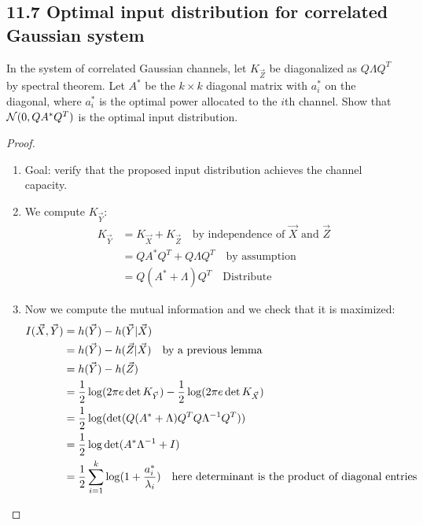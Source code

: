 \documentclass[../main.tex]{subfiles}
\begin{document}
\subsection*{11.7 Optimal input distribution for correlated Gaussian system}
In the system of correlated Gaussian channels, let $K_{\vec Z}$ be diagonalized as $Q\Lambda Q^T$ by spectral theorem. Let $A^*$ be the $k\times k$ diagonal matrix with $a_i^*$ on the diagonal, where $a_i^*$ is the optimal power allocated to the $i$th channel. Show that $\mathcal{N}(0,QA^*Q^T)$ is the optimal input distribution.
\begin{proof}
    \begin{enumerate}
        \item Goal: verify that the proposed input distribution achieves the channel capacity.
        \item We compute $K_{\vec Y}$: \begin{align*}
            K_{\vec Y} &= K_{\vec X}+K_{\vec Z} \quad \text{by independence of $\vec X$ and $\vec Z$}\\
            &= Q A^* Q^T + Q\Lambda Q^T \quad\text{by assumption}\\
            &= Q(A^*+\Lambda)Q^T \quad\text{Distribute}
        \end{align*}
        \item Now we compute the mutual information and we check that it is maximized: \begin{align*}
            I(\vec X,\vec Y) &= h(\vec Y)-h(\vec Y|\vec X)\\
            &=h(\vec Y)-h(\vec Z|\vec X) \quad\text{by a previous lemma}\\
            &=h(\vec Y)-h(\vec Z)\\
            &= \frac{1}{2}\log(2\pi e\det K_{\vec Y})-\frac{1}{2}\log(2\pi e\det K_{\vec X})\\
            &=\frac{1}{2}\log(\det(Q(A^*+\Lambda)Q^TQ\Lambda^{-1}Q^T))\\
            &=\frac{1}{2}\log \det(A^*\Lambda^{-1}+I)\\
            &=\frac{1}{2}\sum_{i=1}^k\log(1+\frac{a_i^*}{\lambda_i}) \quad\text{here determinant is the product of diagonal entries}
        \end{align*}
    \end{enumerate}
\end{proof}
\end{document}
